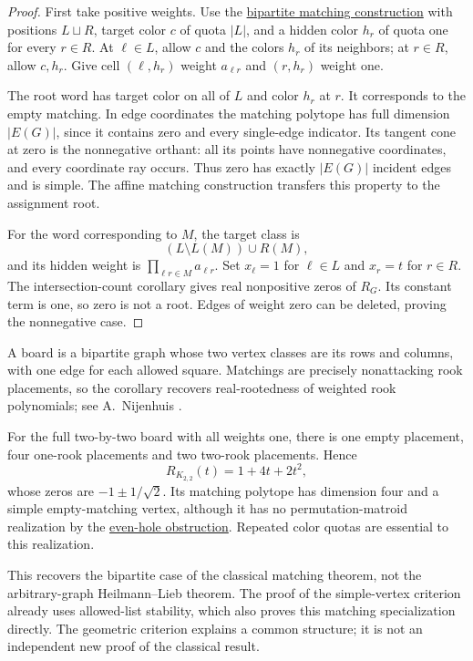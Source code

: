 \begin{proof}
First take positive weights. Use the
\href{stable-sets.htm#matchingPolytopes}{bipartite matching construction}
with positions $L\sqcup R$, target color $c$ of quota $|L|$, and a hidden
color $h_r$ of quota one for every $r\in R$. At $\ell\in L$, allow $c$
and the colors $h_r$ of its neighbors; at $r\in R$, allow $c,h_r$.
Give cell $(\ell,h_r)$ weight $a_{\ell r}$ and $(r,h_r)$ weight one.

The root word has target color on all of $L$ and color $h_r$ at $r$.
It corresponds to the empty matching. In edge coordinates the matching
polytope has full dimension $|E(G)|$, since it contains zero and every
single-edge indicator. Its tangent cone at zero is the nonnegative
orthant: all its points have nonnegative coordinates, and every
coordinate ray occurs. Thus zero has exactly $|E(G)|$ incident edges
and is simple. The affine matching construction transfers this property
to the assignment root.

For the word corresponding to $M$, the target class is
\[
 (L\setminus L(M))\cup R(M),
\]
and its hidden weight is $\prod_{\ell r\in M}a_{\ell r}$.
Set $x_\ell=1$ for $\ell\in L$ and $x_r=t$ for $r\in R$.
The intersection-count corollary gives real nonpositive zeros of $R_G$.
Its constant term is one, so zero is not a root. Edges of weight zero
can be deleted, proving the nonnegative case.
\end{proof}

A board is a bipartite graph whose two vertex classes are its rows and
columns, with one edge for each allowed square. Matchings are precisely
nonattacking rook placements, so the corollary recovers real-rootedness
of weighted rook polynomials; see A.~Nijenhuis \cite{Nijenhuis1976}.

\begin{example}
For the full two-by-two board with all weights one, there is one empty
placement, four one-rook placements and two two-rook placements. Hence
\[
 R_{K_{2,2}}(t)=1+4t+2t^2,
\]
whose zeros are $-1\pm1/\sqrt2$.
Its matching polytope has dimension four and a simple empty-matching
vertex, although it has no permutation-matroid realization by the
\href{stable-sets.htm#evenHoleObstruction}{even-hole obstruction}.
Repeated color quotas are essential to this realization.
\end{example}

\begin{remark}
This recovers the bipartite case of the classical matching theorem,
not the arbitrary-graph Heilmann--Lieb theorem. The proof of the
simple-vertex criterion already uses allowed-list stability, which
also proves this matching specialization directly. The geometric
criterion explains a common structure; it is not an independent new
proof of the classical result.
\end{remark}
